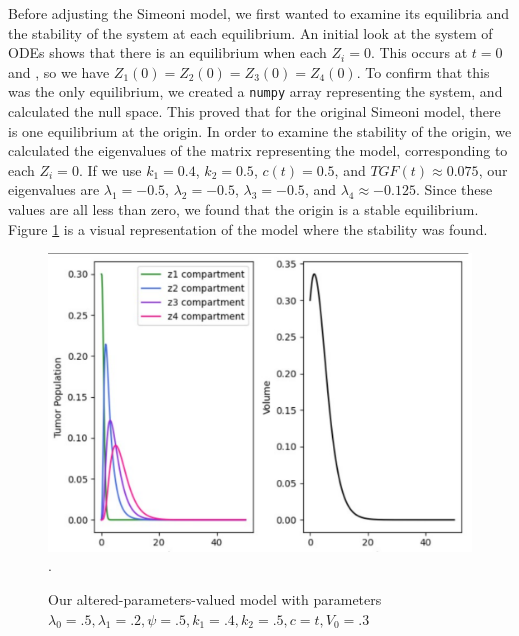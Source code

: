 \documentclass[11pt,reqno]{amsart}
\begin{document}
Before adjusting the Simeoni model, we first wanted to examine its equilibria and the stability of the system at each equilibrium. An initial look at the system of ODEs shows that there is an equilibrium when each $Z_i = 0$. This occurs at $t=0$ and , so we have $Z_1(0) = Z_2(0) = Z_3(0) = Z_4(0)$. To confirm that this was the only equilibrium, we created a \verb!numpy! array representing the system, and calculated the null space. This proved that for the original Simeoni model, there is one equilibrium at the origin. In order to examine the stability of the origin, we calculated the eigenvalues of the matrix representing the model, corresponding to each $Z_i = 0$. If we use $k_1 = 0.4$, $k_2 = 0.5$, $c(t) = 0.5$, and $TGF(t) \approx 0.075$, our eigenvalues are $\lambda_1 = -0.5$, $\lambda_2 = -0.5$, $\lambda_3 = -0.5$, and $\lambda_4 \approx -0.125$. Since these values are all less than zero, we found that the origin is a stable equilibrium. Figure \ref{fig:1} is a visual representation of the model where the stability was found.
\begin{figure}[h]

\begin{center} %
\includegraphics[width=\textwidth]{original_tumor_random_parameters.pdf}. %
\end{center}
\caption{Our altered-parameters-valued model with parameters $\lambda_0=.5, \lambda_1=.2, \psi=.5, k_1 = .4, k_2=.5, c=t, V_0 = .3$}
\label{fig:1}
\end{figure}
\end{document}
